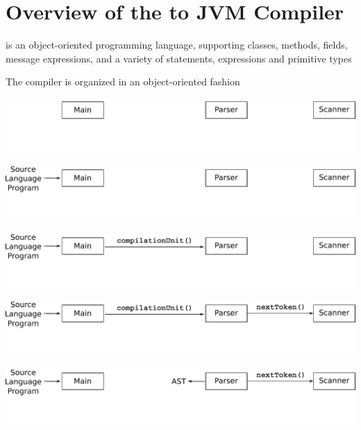 \documentclass[8pt,a4paper,compress]{beamer}
\begin{document}
\section{Overview of the \protect \jmm to JVM Compiler}
\begin{frame}[fragile]
\pause\transdissolve

\jmm is an object-oriented programming language, supporting classes, methods, fields, message expressions, and a variety of statements, expressions and primitive types

\pause\transdissolve\bigskip

The \jmm compiler is organized in an object-oriented fashion

\bigskip

\begin{center}
\begin{overprint}
\includegraphics[scale=0.45]{figures/organization1.pdf}

\includegraphics[scale=0.45]{figures/organization2.pdf}

\includegraphics[scale=0.45]{figures/organization3.pdf}

\includegraphics[scale=0.45]{figures/organization4.pdf}

\includegraphics[scale=0.45]{figures/organization5.pdf}


\end{overprint}
\end{center}
\end{frame}
\end{document}
